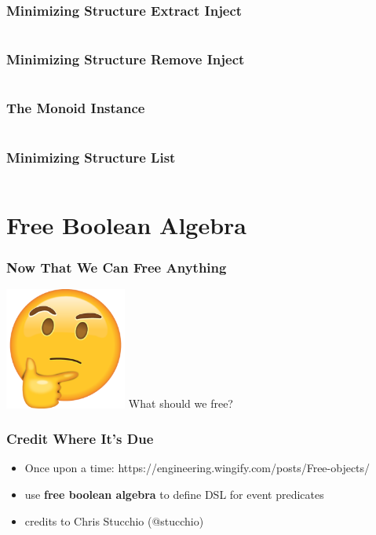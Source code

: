 \documentclass{beamer}
\begin{document}
\begin{frame}
  \frametitle{Minimizing Structure \textemdash{} Extract Inject}
  \inputminted[highlightlines={1, 7}, highlightcolor=yellow!40]{scala}{snippets/free-monoid-3.scala}
\end{frame}

\begin{frame}
  \frametitle{Minimizing Structure \textemdash{} Remove Inject}
  \inputminted[highlightlines={5}, highlightcolor=yellow!40]{scala}{snippets/free-monoid-4.scala}
\end{frame}

\begin{frame}
  \frametitle{The Monoid Instance}
  \inputminted{scala}{snippets/free-monoid-instance.scala}
\end{frame}

\begin{frame}
  \frametitle{Minimizing Structure \textemdash{} List}
  \inputminted{scala}{snippets/free-monoid-5.scala}
\end{frame}

\section{Free Boolean Algebra}\label{sec:free-boolean-algebra}

\begin{frame}
  \frametitle{Now That We Can Free Anything}
  \begin{center}
    \includegraphics[width=0.3\textwidth]{static-images/thinking.png}
    \vfill
    {\Huge What should we free?}
    \vfill
  \end{center}
\end{frame}

\begin{frame}
  \frametitle{Credit Where It's Due}
  \begin{itemize}
  \item Once upon a time:
    https://engineering.wingify.com/posts/Free-objects/
  \item use \textbf{free boolean algebra} to define DSL for event
    predicates
  \item credits to Chris Stucchio (@stucchio)
  \end{itemize}
\end{frame}
\end{document}
